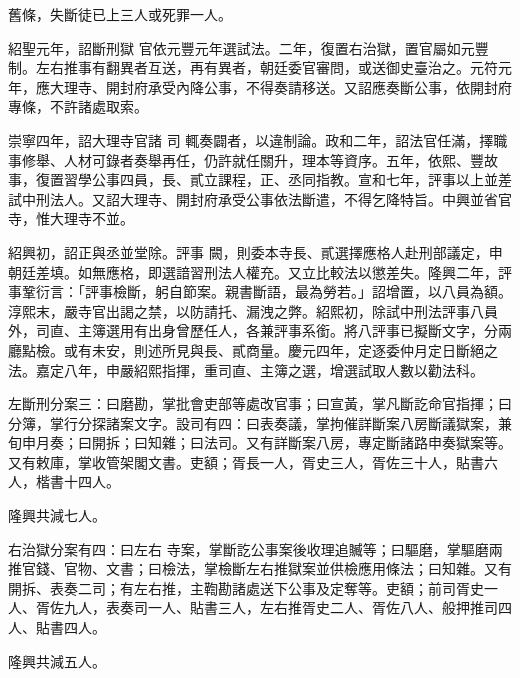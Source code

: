 \begin{pinyinscope}
 舊條，失斷徒已上三人或死罪一人。



 紹聖元年，詔斷刑獄
 官依元豐元年選試法。二年，復置右治獄，置官屬如元豐制。左右推事有翻異者互送，再有異者，朝廷委官審問，或送御史臺治之。元符元年，應大理寺、開封府承受內降公事，不得奏請移送。又詔應奏斷公事，依開封府專條，不許諸處取索。



 崇寧四年，詔大理寺官諸
 司
 輒奏闢者，以違制論。政和二年，詔法官任滿，擇職事修舉、人材可錄者奏舉再任，仍許就任關升，理本等資序。五年，依熙、豐故事，復置習學公事四員，長、貳立課程，正、丞同指教。宣和七年，評事以上並差試中刑法人。又詔大理寺、開封府承受公事依法斷遣，不得乞降特旨。中興並省官寺，惟大理寺不並。



 紹興初，詔正與丞並堂除。評事
 闕，則委本寺長、貳選擇應格人赴刑部議定，申朝廷差填。如無應格，即選諳習刑法人權充。又立比較法以懲差失。隆興二年，評事鞏衍言：「評事檢斷，躬自節案。親書斷語，最為勞若。」詔增置，以八員為額。淳熙末，嚴寺官出謁之禁，以防請托、漏洩之弊。紹熙初，除試中刑法評事八員外，司直、主簿選用有出身曾歷任人，各兼評事系銜。將八評事已擬斷文字，分兩廳點檢。或有未安，則述所見與長、貳商量。慶元四年，定逐委仲月定日斷絕之
 法。嘉定八年，申嚴紹熙指揮，重司直、主簿之選，增選試取人數以勸法科。



 左斷刑分案三：曰磨勘，掌批會吏部等處改官事；曰宣黃，掌凡斷訖命官指揮；曰分簿，掌行分探諸案文字。設司有四：曰表奏議，掌拘催詳斷案八房斷議獄案，兼旬申月奏；曰開拆；曰知雜；曰法司。又有詳斷案八房，專定斷諸路申奏獄案等。又有敕庫，掌收管架閣文書。吏額；胥長一人，胥史三人，胥佐三十人，貼書六人，楷書十四人。



 隆興共減七人。



 右治獄分案有四：曰左右
 寺案，掌斷訖公事案後收理追贓等；曰驅磨，掌驅磨兩推官錢、官物、文書；曰檢法，掌檢斷左右推獄案並供檢應用條法；曰知雜。又有開拆、表奏二司；有左右推，主鞫勘諸處送下公事及定奪等。吏額；前司胥史一人、胥佐九人，表奏司一人、貼書三人，左右推胥史二人、胥佐八人、般押推司四人、貼書四人。



 隆興共減五人。




\end{pinyinscope}
